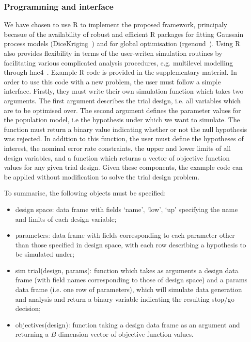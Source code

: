 \documentclass{article} %
\begin{document}
\subsubsection{Programming and interface}

We have chosen to use R to implement the proposed framework, principaly becasue of the availability of robust and efficient R packages for fitting Gaussain process models (DiceKriging~\cite{Roustant2012}) and for global optimisation (rgenoud~\cite{MebaneJr.2011}). Using R also provides flexibility in terms of the user-writen simulation routines by facilitating various complicated analysis procedures, e.g. multilevel modelling through lme4~\cite{Bates2015}. Example R code is provided in the supplementary material. In order to use this code with a new problem, the user must follow a simple interface. Firstly, they must write their own simulation function which takes two arguments. The first argument describes the trial design, i.e. all variables which are to be optimised over. The second argument defines the parameter values for the population model, i.e the hypothesis under which we want to simulate. The function must return a binary value indicating whether or not the null hypothesis was rejected. In addition to this function, the user must define the hypotheses of interest, the nominal error rate constraints, the upper and lower limits of all design variables, and a function which returns a vector of objective function values for any given trial design. Given these components, the example code can be applied without modification to solve the trial design problem.

To summarise, the following objects must be specified:
\begin{itemize}
\item design space: data frame with fields `name', `low', `up' specifying the name and limits of each design variable;
\item parameters: data frame with fields corresponding to each parameter other than those specified in design space, with each row describing a hypothesis to be simulated under;
\item sim trial(design, params): function which takes as arguments a design data frame (with field names corresponding to those of design space) and a params data frame (i.e. one row of parameters), which will simulate data generation and analysis and return a binary variable indicating the resulting stop/go decision;
\item objectives(design): function taking a design data frame as an argument and returning a $B$ dimension vector of objective function values.
\end{itemize}
\end{document}
